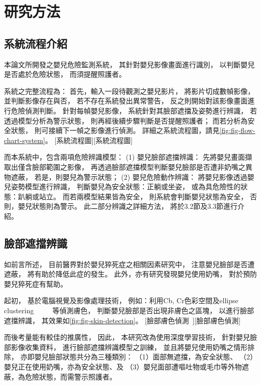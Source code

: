 \documentclass[class=NCU_thesis, crop=false]{standalone}
\begin{document}
\chapter{研究方法}

\section{系統流程介紹}
本論文所開發之嬰兒危險監測系統，
其針對嬰兒影像畫面進行識別，
以判斷嬰兒是否處於危險狀態，
而須提醒照護者。

系統之完整流程為：
首先，輸入一段待觀測之嬰兒影片，
將影片切成數幀影像，
並判斷影像存在與否，
若不存在系統發出異常警告，
反之則開始對該影像畫面進行危險偵測判斷。
針對每幀嬰兒影像，
系統針對其臉部遮擋及姿勢進行辨識，
若透過模型分析為警示狀態，
則再經後續步驟判斷是否提醒照護者；
而若分析為安全狀態，
則可接續下一幀之影像進行偵測。
詳細之系統流程圖，請見\cref{fig:fig-flow-chart-system}。
[系統流程圖][系統流程圖]

而本系統中，包含兩項危險辨識模型：
(1) 嬰兒臉部遮擋辨識：
先將嬰兒畫面擷取出僅含臉部範圍之影像，
再透過臉部遮擋模型判斷嬰兒臉部是否遭非奶嘴之異物遮蔽，
若是，則嬰兒為警示狀態；
(2) 嬰兒危險動作辨識：
將嬰兒影像透過嬰兒姿勢模型進行辨識，
判斷嬰兒為安全狀態：正躺或坐姿，
或為具危險性的狀態：趴躺或站立。
而若兩模型結果皆為安全，
則系統會判斷嬰兒狀態為安全，
否則，嬰兒狀態則為警示。
此二部分辨識之詳細方法，
將於3.2節及3.3節進行介紹。

\section{臉部遮擋辨識}
如前言所述，
目前醫界對於嬰兒猝死症之相關因素研究中，
注意嬰兒臉部是否遭遮蔽，
將有助於降低此症的發生。
此外，亦有研究發現嬰兒使用奶嘴，
對於預防嬰兒猝死症有幫助。

起初，
基於電腦視覺及影像處理技術，
例如：利用Cb, Cr色彩空間及ellipse clustering
~\cite{tang_hands_2008}~\cite{li_face_2011}~\cite{noauthor_python_nodate}~\cite{walkonnet_python_nodate}
等偵測膚色，
判斷嬰兒臉部是否出現非膚色之區塊，
以進行臉部遮擋辨識，
其效果如\cref{fig:fig-skin-detection}。
[臉部膚色偵測~\cite{walkonnet_python_nodate}][臉部膚色偵測]

而後考量能有較佳的推廣性，
因此，
本研究改為使用深度學習技術，
針對嬰兒臉部影像收集資料，
進行臉部遮擋辨識模型之訓練，
並且將嬰兒使用奶嘴之情形排除，
亦即嬰兒臉部狀態共分為三種類別：
（1）面部無遮擋，為安全狀態、
（2）嬰兒正在使用奶嘴，亦為安全狀態、及
（3）嬰兒面部遭嘔吐物或毛巾等外物遮蔽，為危險狀態，而需警示照護者。
\end{document}
